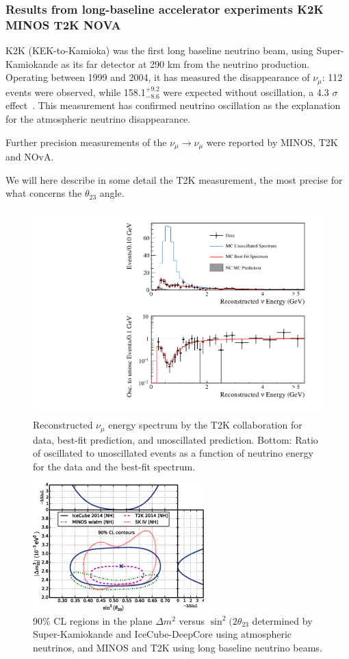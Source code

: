 \subsubsection{Results from long-baseline accelerator experiments K2K MINOS T2K NOVA}

K2K (KEK-to-Kamioka) was the first long baseline neutrino beam, using Super-Kamiokande as its far detector at 290 km from the neutrino production. Operating between 1999 and 2004, it has measured the disappearance of $\nu_\mu$: 112 events were observed, while 158.1$^{+9.2}_{-8.6}$ were expected without oscillation, a 4.3 $\sigma$ effect~\cite{Ahn:2006zza}. This measurement has confirmed neutrino oscillation as the explanation for the atmospheric neutrino disappearance. 

Further precision measurements of the $\nu_\mu \rightarrow \nu_\mu$ were reported by MINOS, T2K and NOvA.

We will here describe in some detail the T2K measurement, the most precise for what concerns the $\theta_{23}$ angle.

\begin{figure}[htbp]
\centering
\includegraphics[width=0.6\linewidth]{figures/t2k-disapp.pdf}
  \caption{
Reconstructed $\nu_\mu$ energy spectrum by the T2K collaboration for data, best-fit prediction, and
unoscillated prediction. Bottom: Ratio of oscillated to unoscillated events as a function of
neutrino energy for the data and the best-fit spectrum.
}
 \label{fig:t2kdis}
 \end{figure}

\begin{figure}[htbp]
\centering
\includegraphics[width=0.6\linewidth]{figures/atm-contour.pdf}
  \caption{
  90\% CL regions in the plane $\Delta m^2 $ versus $\sin^2 (2 \theta_{23}$
  determined by Super-Kamiokande and IceCube-DeepCore using atmospheric neutrinos, and MINOS and T2K using long baseline neutrino beams. 
}
 \label{fig:atm-contour}
 \end{figure}
 
